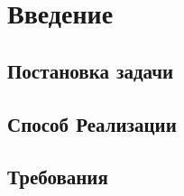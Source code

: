 \documentclass{article}
\begin{document}


\tableofcontents

\newpage

\section{Введение}

\subsection{Постановка задачи}

\subsection{Способ Реализации}

\subsection{Требования}
\end{document}
